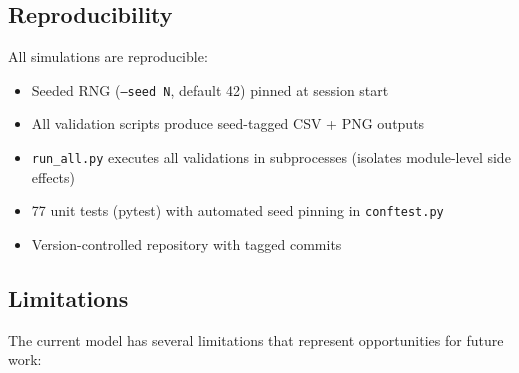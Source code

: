 \documentclass[3p,times,preprint]{elsarticle}
\begin{document}
\subsection{Reproducibility}

All simulations are reproducible:
\begin{itemize}[nosep]
  \item Seeded RNG (\texttt{--seed N}, default 42) pinned at session start
  \item All validation scripts produce seed-tagged CSV + PNG outputs
  \item \texttt{run\_all.py} executes all validations in subprocesses
    (isolates module-level side effects)
  \item 77 unit tests (pytest) with automated seed pinning in
    \texttt{conftest.py}
  \item Version-controlled repository with tagged commits
\end{itemize}

\subsection{Limitations}

The current model has several limitations that represent opportunities
for future work:
\end{document}
